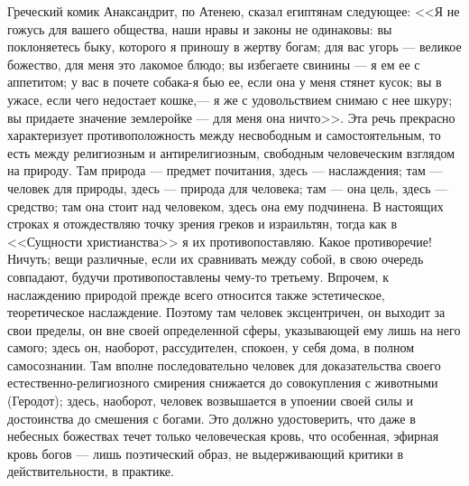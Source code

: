 \documentclass[12pt]{article}
\begin{document}
Греческий комик Анаксандрит, по Атенею, сказал египтянам следующее: <<Я не гожусь для вашего общества, наши нравы и законы не одинаковы: вы поклоняетесь быку, которого я приношу в жертву богам; для вас угорь --- великое божество, для меня это лакомое блюдо; вы избегаете свинины --- я ем ее с аппетитом; у вас в почете собака-я бью ее, если она у меня стянет кусок; вы в ужасе, если чего недостает кошке,--- я же с удовольствием снимаю с нее шкуру; вы придаете значение землеройке --- для меня она ничто>>. Эта речь прекрасно характеризует противоположность между несвободным и самостоятельным, то есть между религиозным и антирелигиозным, свободным человеческим взглядом на природу. Там природа --- предмет почитания, здесь --- наслаждения; там --- человек для природы, здесь --- природа для человека; там --- она цель, здесь --- средство; там она стоит над человеком, здесь она ему подчинена. В настоящих строках я отождествляю точку зрения греков и израильтян, тогда как в <<Сущности христианства>> я их противопоставляю. Какое противоречие! Ничуть; вещи различные, если их сравнивать между собой, в свою очередь совпадают, будучи противопоставлены чему-то третьему. Впрочем, к наслаждению природой прежде всего относится также эстетическое, теоретическое наслаждение. Поэтому там человек эксцентричен, он выходит за свои пределы, он вне своей определенной сферы, указывающей ему лишь на него самого; здесь он, наоборот, рассудителен, спокоен, у себя дома, в полном самосознании. Там вполне последовательно человек для доказательства своего естественно-религиозного смирения снижается до совокупления с животными (Геродот); здесь, наоборот, человек возвышается в упоении своей силы и достоинства до смешения с богами. Это должно удостоверить, что даже в небесных божествах течет только человеческая кровь, что особенная, эфирная кровь богов --- лишь поэтический образ, не выдерживающий критики в действительности, в практике.



\section{}
\end{document}
